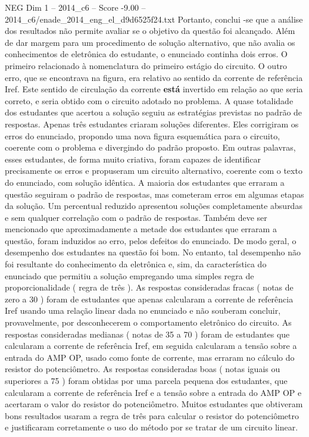 \begin{textsample}{NEG Dim 1 – 2014\_c6 – Score -9.00 – 2014\_c6/enade\_2014\_eng\_el\_d9d6525f24.txt}
Portanto, conclui -se que a análise dos resultados não permite avaliar se o objetivo da questão foi alcançado.
Além de dar margem para um procedimento de solução alternativo, que não avalia os conhecimentos de eletrônica do estudante, o enunciado continha dois erros.
O primeiro relacionado à nomenclatura do primeiro estágio do circuito.
O outro erro, que se encontrava na figura, era relativo ao sentido da corrente de referência Iref.
Este sentido de circulação da corrente \textbf{está} invertido em relação ao que seria correto, e seria obtido com o circuito adotado no problema.
A quase totalidade dos estudantes que acertou a solução seguiu as estratégias previstas no padrão de respostas.
Apenas três estudantes criaram soluções diferentes.
Eles corrigiram os erros do enunciado, propondo uma nova figura esquemática para o circuito, coerente com o problema e divergindo do padrão proposto.
Em outras palavras, esses estudantes, de forma muito criativa, foram capazes de identificar precisamente os erros e propuseram um circuito alternativo, coerente com o texto do enunciado, com solução idêntica.
A maioria dos estudantes que erraram a questão seguiram o padrão de respostas, mas cometeram erros em algumas etapas da solução.
Um percentual reduzido apresentou soluções completamente absurdas e sem qualquer correlação com o padrão de respostas.
Também deve ser mencionado que aproximadamente a metade dos estudantes que erraram a questão, foram induzidos ao erro, pelos defeitos do enunciado.
De modo geral, o desempenho dos estudantes na questão foi bom.
No entanto, tal desempenho não foi resultante do conhecimento da eletrônica e, sim, da característica do enunciado que permitiu a solução empregando uma simples regra de proporcionalidade ( regra de três ).
As respostas consideradas fracas ( notas de zero a 30 ) foram de estudantes que apenas calcularam a corrente de referência Iref usando uma relação linear dada no enunciado e não souberam concluir, provavelmente, por desconhecerem o comportamento eletrônico do circuito.
As respostas consideradas medianas ( notas de 35 a 70 ) foram de estudantes que calcularam a corrente de referência Iref, em seguida calcularam a tensão sobre a entrada do AMP OP, usado como fonte de corrente, mas erraram no cálculo do resistor do potenciômetro.
As respostas consideradas boas ( notas iguais ou superiores a 75 ) foram obtidas por uma parcela pequena dos estudantes, que calcularam a corrente de referência Iref e a tensão sobre a entrada do AMP OP e acertaram o valor do resistor do potenciômetro.
Muitos estudantes que obtiveram bons resultados usaram a regra de três para calcular o resistor do potenciômetro e justificaram corretamente o uso do método por se tratar de um circuito linear.

\end{textsample}

